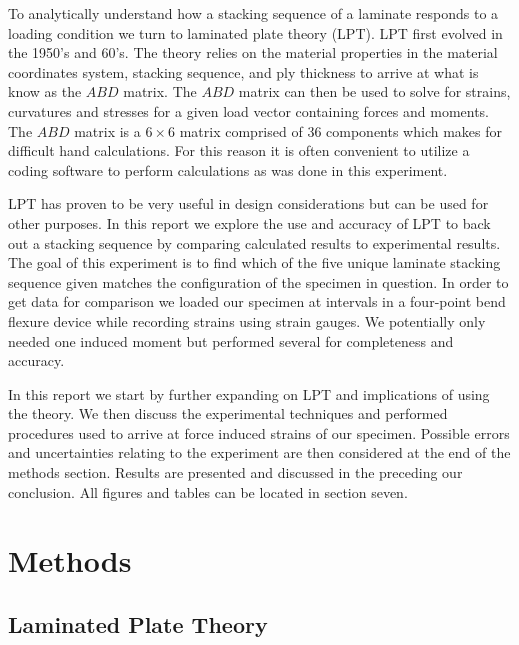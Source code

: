 \documentclass[12pt]{article}
\begin{document}
	
	To analytically understand how a stacking sequence of a laminate responds to a loading condition we turn to laminated plate theory (LPT).  LPT first evolved in the 1950's and 60's.\cite{Gibson} The theory relies on the material properties in the material coordinates system, stacking sequence, and ply thickness to arrive at what is know as the $ABD$ matrix. The $ABD$ matrix can then be used to solve for strains, curvatures and stresses for a given load vector containing forces and moments.  The $ABD$ matrix is  a $6\times 6$ matrix  comprised of 36 components which makes for difficult hand calculations. For this reason it is often convenient to utilize a coding software to perform calculations as was done in this experiment. 

	
	LPT has proven to be very useful in design considerations but can be used for other purposes.  In this report we explore the use  and accuracy of LPT to back out a stacking sequence by comparing calculated results to experimental results. The goal of this experiment is to find which of the five unique laminate stacking sequence given  matches the configuration of the specimen in question. In order to get data for comparison we loaded our specimen at intervals in a four-point bend flexure device while recording strains using strain gauges.  We potentially only needed one induced moment but performed several for completeness and accuracy. 
	
	  
	  In this report we start by further expanding on LPT and implications of using the theory.  We then discuss the experimental techniques and performed procedures used to arrive at force induced strains of our specimen. Possible errors and uncertainties  relating to the experiment are then considered at the end of the methods section. Results are presented and discussed in the preceding our conclusion. All figures and tables can be located in section seven. 


\section{Methods}

\subsection{Laminated Plate Theory} %
\end{document}
